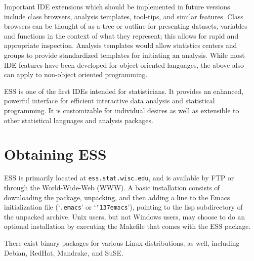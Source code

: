 \documentclass{article}
\newcommand{\stexttt}[1]{{\small\texttt{#1}}}
\newcommand{\US}{{\char'137}}        %
\newcommand{\file}[1]{`\stexttt{#1}'}
\begin{document}
Important IDE extensions which should be implemented in future
versions include class browsers, analysis templates, tool-tips, and
similar features.  Class browsers can be thought of as a tree or
outline for presenting datasets, variables and functions in the
context of what they represent; this allows for rapid and appropriate
inspection.  Analysis templates would allow statistics centers and
groups to provide standardized templates for initiating an analysis.
While most IDE features have been developed for object-oriented
languages, the above also can apply to non-object oriented
programming.

ESS is one of the first IDEs intended for statisticians.  It provides
an enhanced, powerful interface for efficient interactive data
analysis and statistical programming.  It is customizable for
individual desires as well as extensible to other statistical
languages and analysis packages.

\baselineskip=1.5pc




\appendix
\section{Obtaining ESS}
\label{sec:getIt}

ESS \citep{ESS} is primarily located at \stexttt{ess.stat.wisc.edu},
and is available by FTP or through the World-Wide-Web (WWW).  A basic
installation consists of downloading the package, unpacking, and then
adding a line to the Emacs initialization file (\file{.emacs} or
\file{\US emacs}), pointing to the lisp subdirectory of the unpacked
archive.  Unix users, but not Windows users, may choose to do an
optional installation by executing the Makefile that comes with the
ESS package.

There exist binary packages for various Linux distributions, as well,
including Debian, RedHat, Mandrake, and SuSE.

\clearpage
\end{document}
